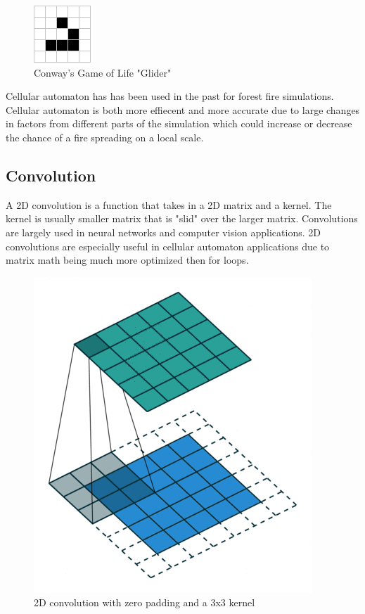 \documentclass[ aps, pra, reprint, notitlepage ]{revtex4-1}
\begin{document}
\begin{figure}[ht]
	\includegraphics[scale=0.75]{Pictures/Glider}
	\caption{\label{Glider}Conway's Game of Life "Glider"}
\end{figure}

Cellular automaton has has been used in the past for forest fire simulations. Cellular automaton is both more effiecent and more accurate due to large changes in factors from different parts of the simulation which could increase or decrease the chance of a fire spreading on a local scale.\cite{CellAutmoFire}

\subsection{\label{Convolution} Convolution}

A 2D convolution is a function that takes in a 2D matrix and a kernel. The kernel is usually smaller matrix that is "slid" over the larger matrix. Convolutions are largely used in neural networks and computer vision applications. 2D convolutions are especially useful in cellular automaton applications due to matrix math being much more optimized then for loops.

\begin{figure}[ht]
	\includegraphics[scale=0.5]{Pictures/StaticConvolution}
	\caption{\label{2DConvolutionFig}2D convolution with zero padding and a 3x3 kernel}
\end{figure}
\end{document}
